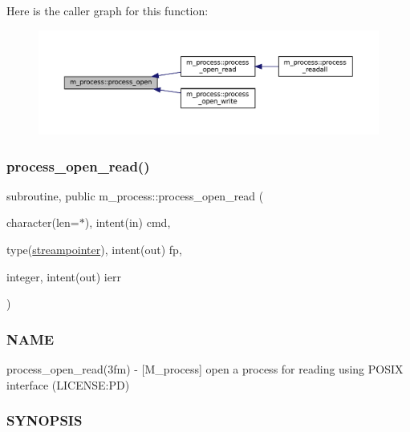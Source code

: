 Here is the caller graph for this function\+:
\nopagebreak
\begin{figure}[H]
\begin{center}
\leavevmode
\includegraphics[width=350pt]{namespacem__process_a3c0f543a9ceff2671041d73660f60a59_icgraph}
\end{center}
\end{figure}
\mbox{\label{namespacem__process_aaaf4d1926258a4cec7da7fc61c38c79d}} 
\subsubsection{\texorpdfstring{process\+\_\+open\+\_\+read()}{process\_open\_read()}}
{\footnotesize\ttfamily subroutine, public m\+\_\+process\+::process\+\_\+open\+\_\+read (\begin{DoxyParamCaption}\item[{character(len=$\ast$), intent(in)}]{cmd,  }\item[{type(\mbox{\hyperlink{structm__process_1_1streampointer}{streampointer}}), intent(out)}]{fp,  }\item[{integer, intent(out)}]{ierr }\end{DoxyParamCaption})}



\subsubsection*{N\+A\+ME}

process\+\_\+open\+\_\+read(3fm) -\/ \mbox{[}M\+\_\+process\mbox{]} open a process for reading using P\+O\+S\+IX interface (L\+I\+C\+E\+N\+SE\+:PD) 

\subsubsection*{S\+Y\+N\+O\+P\+S\+IS}

